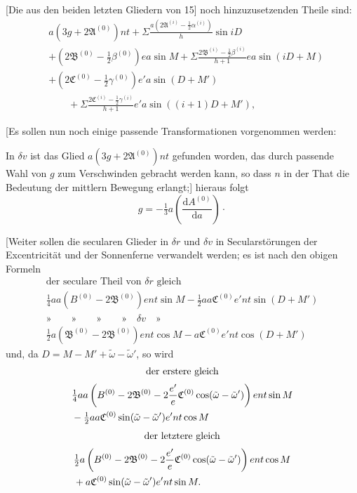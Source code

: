 [Die aus den beiden letzten Gliedern von 15] noch hinzuzusetzenden Theile sind:
\hypertarget{native-396}{}
\[
\begin{aligned}
&a(3g+2\mathfrak A^{(0)})nt+\Sigma\frac{a(2\mathfrak A^{(i)}-\tfrac12\alpha^{(i)})}h\sin iD\\
&+(2\mathfrak B^{(0)}-\tfrac12\beta^{(0)})ea\sin M+\Sigma\frac{2\mathfrak B^{(i)}-\tfrac12\beta^{(i)}}{h+1}ea\sin(iD+M)\\
&+(2\mathfrak C^{(0)}-\tfrac12\gamma^{(0)})e'a\sin(D+M')\\
&\qquad+\Sigma\frac{2\mathfrak C^{(i)}-\tfrac12\gamma^{(i)}}{h+1}e'a\sin((i+1)D+M'),
\end{aligned}
\]

[Es sollen nun noch einige passende Transformationen vorgenommen werden:

In \(\delta v\) ist das Glied \(a(3g+2\mathfrak A^{(0)})nt\) gefunden worden, das durch passende Wahl von \(g\) zum Verschwinden gebracht werden kann, so dass \(n\) in der That die Bedeutung der mittlern Bewegung erlangt;] hieraus folgt
\[g=-\tfrac13a\left(\frac{\mathrm{d}A^{(0)}}{\mathrm{d}a}\right)\mathpunct{\cdot}\]

[Weiter sollen die secularen Glieder in \(\delta r\) und \(\delta v\) in Secularstörungen der Excentricität und der Sonnenferne verwandelt werden; es ist nach den obigen Formeln
\[
\begin{gathered}
\text{der seculare Theil von }\delta r\text{ gleich}\\[.5ex]
\tfrac14aa(B^{(0)}-2\mathfrak B^{(0)})ent\sin M-\tfrac12aa\mathfrak C^{(0)}e'nt\sin(D+M')\\[1ex]
\text{»}\qquad\text{»}\qquad\text{»}\qquad\text{»}\quad\delta v\quad\text{»}\\[.5ex]
\tfrac12a(\mathfrak B^{(0)}-2\mathfrak B^{(0)})ent\cos M-a\mathfrak C^{(0)}e'nt\cos(D+M')
\end{gathered}
\]
\noindent und, da \(D=M-M'+\tilde\omega-\tilde\omega'\), so wird
\[
\begin{gathered}
\text{der erstere gleich}\\[.5ex]
\begin{aligned}
&\tfrac14aa\left(B^{(0)}-2\mathfrak B^{(0)}-2\frac{e'}e\mathfrak C^{(0)}\cos(\tilde\omega-\tilde\omega')\right)ent\sin M\\
&\hfill-\tfrac12aa\mathfrak C^{(0)}\sin(\tilde\omega-\tilde\omega')e'nt\cos M
\end{aligned}
\end{gathered}
\]
\[
\begin{gathered}
\text{der letztere gleich}\\[.5ex]
\begin{aligned}
&\tfrac12a\left(B^{(0)}-2\mathfrak B^{(0)}-2\frac{e'}e\mathfrak C^{(0)}\cos(\tilde\omega-\tilde\omega')\right)ent\cos M\\
&\hfill+a\mathfrak C^{(0)}\sin(\tilde\omega-\tilde\omega')e'nt\sin M.
\end{aligned}
\end{gathered}
\]

